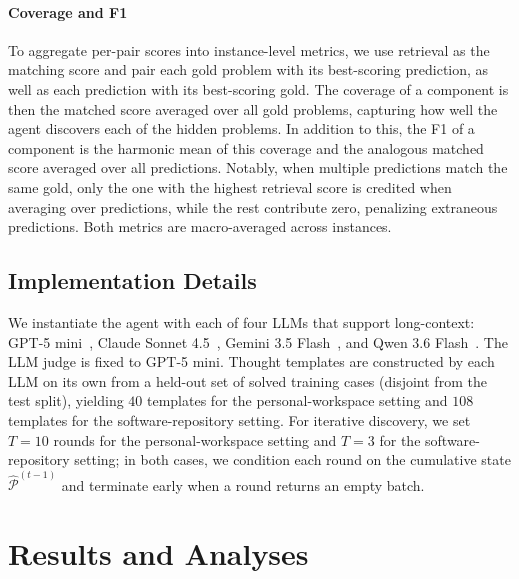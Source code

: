 \documentclass{llmxive}
\begin{document}
\paragraph{Coverage and F1}
To aggregate per-pair scores into instance-level metrics, we use retrieval as the matching score and pair each gold problem with its best-scoring prediction, as well as each prediction with its best-scoring gold. The coverage of a component is then the matched score averaged over all gold problems, capturing how well the agent discovers each of the hidden problems. In addition to this, the F1 of a component is the harmonic mean of this coverage and the analogous matched score averaged over all predictions. Notably, when multiple predictions match the same gold, only the one with the highest retrieval score is credited when averaging over predictions, while the rest contribute zero, penalizing extraneous predictions. Both metrics are macro-averaged across instances.

\subsection{Implementation Details}
We instantiate the agent with each of four LLMs that support long-context: GPT-5 mini~\cite{openai2025gpt5}, Claude Sonnet 4.5~\cite{anthropic2025sonnet45}, Gemini 3.5 Flash~\cite{google2026gemini35flash}, and Qwen 3.6 Flash~\cite{qwen2026qwen36}. The LLM judge is fixed to GPT-5 mini. Thought templates are constructed by each LLM on its own from a held-out set of solved training cases (disjoint from the test split), yielding $40$ templates for the personal-workspace setting and $108$ templates for the software-repository setting. For iterative discovery, we set $T=10$ rounds for the personal-workspace setting and $T=3$ for the software-repository setting; in both cases, we condition each round on the cumulative state $\hat{\mathcal{P}}^{(t-1)}$ and terminate early when a round returns an empty batch.

\section{Results and Analyses}
\end{document}
